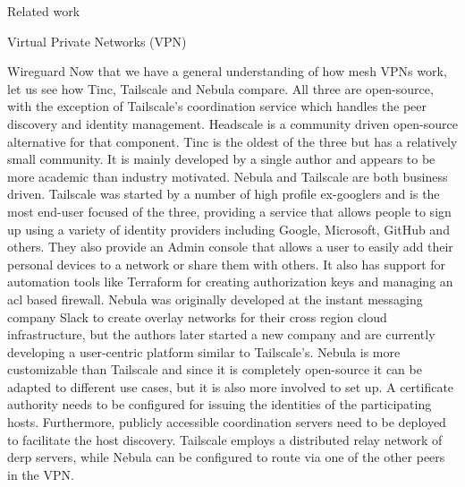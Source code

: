 \begin{frame}[fragile]{Related work}
\begin{block}{Virtual Private Networks (VPN)}
\begin{block}{Wireguard}
Now that we have a general understanding of how mesh VPNs work, let us
see how Tinc, Tailscale and Nebula compare. All three are open-source,
with the exception of Tailscale's coordination service which handles the
peer discovery and identity management. Headscale
\autocite{fontJuanfontHeadscale2022} is a community driven open-source
alternative for that component. Tinc is the oldest of the three but has
a relatively small community. It is mainly developed by a single author
and appears to be more academic than industry motivated. Nebula and
Tailscale are both business driven. Tailscale was started by a number of
high profile ex-googlers and is the most end-user focused of the three,
providing a service that allows people to sign up using a variety of
identity providers including Google, Microsoft, GitHub and others. They
also provide an Admin console that allows a user to easily add their
personal devices to a network or share them with others. It also has
support for automation tools like Terraform for creating authorization
keys and managing an \gls{acl} based firewall. Nebula was originally
developed at the instant messaging company Slack to create overlay
networks for their cross region cloud infrastructure, but the authors
later started a new company and are currently developing a user-centric
platform similar to Tailscale's. Nebula is more customizable than
Tailscale and since it is completely open-source it can be adapted to
different use cases, but it is also more involved to set up. A
certificate authority needs to be configured for issuing the identities
of the participating hosts. Furthermore, publicly accessible
coordination servers need to be deployed to facilitate the host
discovery. Tailscale employs a distributed relay network of \gls{derp}
servers, while Nebula can be configured to route via one of the other
peers in the VPN.
\end{block}
\end{block}
\end{frame}

